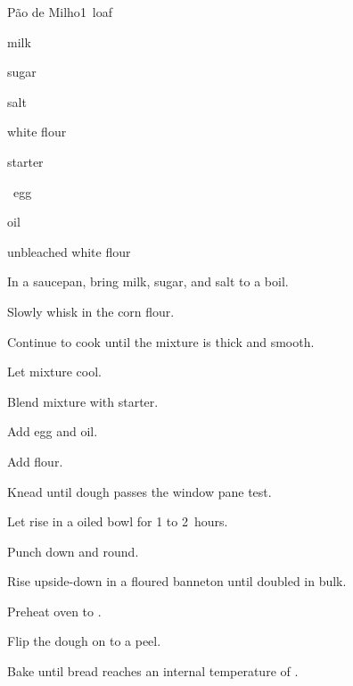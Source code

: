\begin{recipe}{Pão de Milho}{}{1~loaf}

\begin{ingredients}
\item {} milk
\item \C{\quarter} sugar
\item {} salt
\item {} white  flour
\item {} starter
\item \half{}~egg
\item {} oil
\item {} unbleached white flour
\end{ingredients}

\begin{directions}
\item In a saucepan, bring milk, sugar, and salt to a boil.
\item Slowly whisk in the corn flour.
\item Continue to cook until the mixture is thick and smooth.
\item Let mixture cool.
\item Blend mixture with starter.
\item Add egg and oil.
\item Add flour.
\item Knead until dough passes the window pane test.
\item Let rise in a oiled bowl for 1 to 2~hours.
\item Punch down and round.
\item Rise upside-down in a floured banneton until doubled in bulk.
\item Preheat oven to .
\item Flip the dough on to a peel.
\item Bake until bread reaches an internal temperature of .
\end{directions}

\end{recipe}

